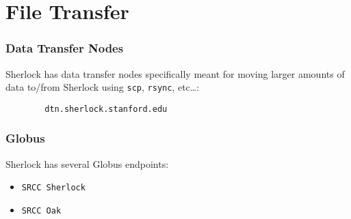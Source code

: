 \documentclass[aspectratio=169]{beamer}
\begin{document}


\section{File Transfer}

\frame{\sectionpage}

\begin{frame}[fragile]
	\frametitle{Data Transfer Nodes}
	Sherlock has data transfer nodes specifically meant for moving larger amounts of data to/from Sherlock using \texttt{scp}, \texttt{rsync}, etc\ldots:
	\begin{verbatim}
		dtn.sherlock.stanford.edu
	\end{verbatim}
\end{frame}

\begin{frame}
	\frametitle{Globus}
	Sherlock has several Globus endpoints:
	\begin{itemize}
		\item \texttt{SRCC Sherlock}
		\item \texttt{SRCC Oak}
	\end{itemize}
\end{frame}

\end{document}

